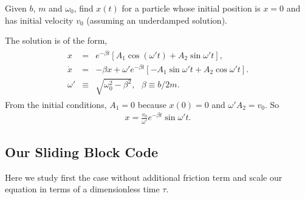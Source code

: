 \documentclass[letterpaper,10pt,english]{sphinxmanual}
\begin{document}
Given \(b\), \(m\) and \(\omega_0\), find \(x(t)\) for a particle whose
initial position is \(x=0\) and has initial velocity \(v_0\) (assuming an
underdamped solution).

The solution is of the form,
\begin{equation*}
\begin{split}
\begin{eqnarray*}
x&=&e^{-\beta t}\left[A_1\cos(\omega' t)+A_2\sin\omega't\right],\\
\dot{x}&=&-\beta x+\omega'e^{-\beta t}\left[-A_1\sin\omega't+A_2\cos\omega't\right].\\
\omega'&\equiv&\sqrt{\omega_0^2-\beta^2},~~~\beta\equiv b/2m.
\end{eqnarray*}
\end{split}
\end{equation*}
From the initial conditions, \(A_1=0\) because \(x(0)=0\) and \(\omega'A_2=v_0\). So
\begin{equation*}
\begin{split}
x=\frac{v_0}{\omega'}e^{-\beta t}\sin\omega't.
\end{split}
\end{equation*}

\subsection{Our Sliding Block Code}
\label{\detokenize{chapter4:our-sliding-block-code}}
Here we study first the case without additional friction term and scale our equation
in terms of a dimensionless time \(\tau\).
\end{document}
